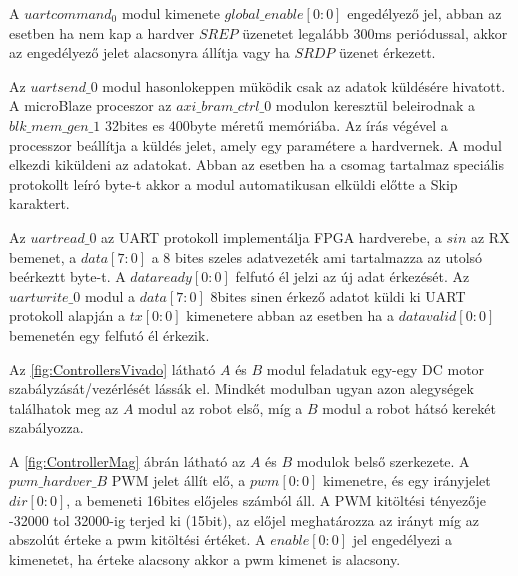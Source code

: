 A $uartcommand_0$ modul kimenete $global\_enable[0:0]$ engedélyező jel, abban az esetben ha nem kap a hardver $SREP$ üzenetet legalább 300ms periódussal, akkor az engedélyező jelet alacsonyra állítja vagy ha $SRDP$ üzenet érkezett.

Az $uartsend\_0$ modul hasonlokeppen müködik csak az adatok küldésére hivatott. A microBlaze proceszor az $axi\_bram\_ctrl\_0$ modulon keresztül beleirodnak a $blk\_mem\_gen\_1$ \cite{DualPortRam} 32bites es 400byte méretű memóriába.
Az írás végével a processzor beállítja a küldés jelet, amely egy paramétere a hardvernek. A modul elkezdi kiküldeni az adatokat. Abban az esetben ha a csomag tartalmaz speciális protokollt leíró byte-t akkor a modul automatikusan elküldi előtte a Skip karaktert.

Az $uartread\_0$ az UART protokoll implementálja FPGA hardverebe, a $sin$ az RX bemenet, a $data[7:0]$ a 8 bites szeles adatvezeték ami tartalmazza az utolsó beérkeztt byte-t. A $dataready[0:0]$ felfutó él jelzi az új adat érkezését. Az $uartwrite\_0$ modul a $data[7:0]$ 8bites sinen érkező adatot küldi ki UART protokoll alapján a $tx[0:0]$ kimenetere abban az esetben ha a $datavalid[0:0]$ bemenetén egy felfutó él érkezik.

Az \ref{fig:ControllersVivado} látható $A$ és $B$ modul feladatuk egy-egy DC motor szabályzását/vezérlését lássák el. Mindkét modulban ugyan azon alegységek találhatok meg az $A$ modul az robot első, míg a $B$ modul a robot hátsó kerekét szabályozza.

A \ref{fig:ControllerMag} ábrán látható az $A$ és $B$ modulok belső szerkezete. A $pwm\_hardver\_B$ PWM jelet állít elő, a $pwm[0:0]$ kimenetre, és egy irányjelet $dir[0:0]$, a bemeneti 16bites előjeles számból áll. A PWM kitöltési tényezője -32000 tol 32000-ig terjed ki (15bit), az előjel meghatározza az irányt míg az abszolút érteke a pwm kitöltési értéket. A $enable[0:0]$ jel engedélyezi a kimenetet, ha érteke alacsony akkor a pwm kimenet is alacsony.


